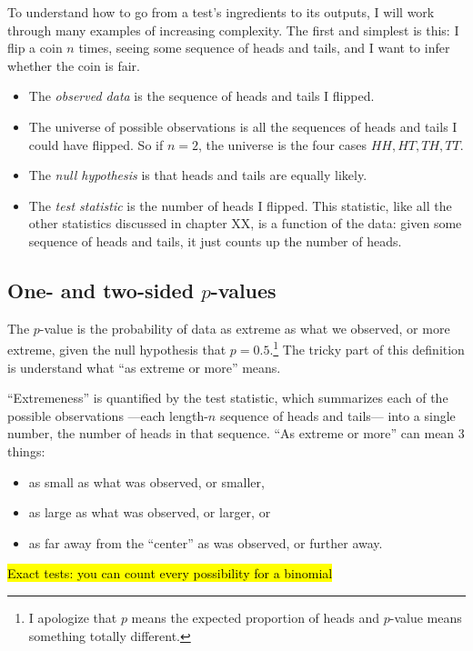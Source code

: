 To understand how to go from a test's ingredients to its outputs, I will work
through many examples of increasing complexity. The first and simplest is this:
I flip a coin $n$ times, seeing some sequence of heads and tails, and I want to
infer whether the coin is fair.

\begin{itemize}
\item The \emph{observed data} is the sequence of heads and tails I flipped.
\item The universe of possible observations is all the sequences of heads and tails I could have flipped. So if $n=2$, the universe is the four cases $HH, HT, TH, TT$.
\item The \emph{null hypothesis} is that heads and tails are equally likely.
\item The \emph{test statistic} is the number of heads I flipped. This statistic, like all the other statistics discussed in chapter XX, is a function of the data: given some sequence of heads and tails, it just counts up the number of heads.
\end{itemize}

\subsection{One- and two-sided $p$-values}

The $p$-value is the probability of data as extreme as what we observed, or
more extreme, given the null hypothesis that $p = 0.5$.\footnote{I apologize
that $p$ means the expected proportion of heads and $p$-value means something
totally different.} The tricky part of this definition is understand what ``as
extreme or more'' means.

``Extremeness'' is quantified by the test statistic, which summarizes each of
the possible observations ---each length-$n$ sequence of heads and tails---
into a single number, the number of heads in that sequence. ``As extreme or
more'' can mean 3 things:
\begin{itemize}
    \item as small as what was observed, or smaller,
    \item as large as what was observed, or larger, or
    \item as far away from the ``center'' as was observed, or further away.
\end{itemize}

\hl{Exact tests: you can count every possibility for a binomial}

